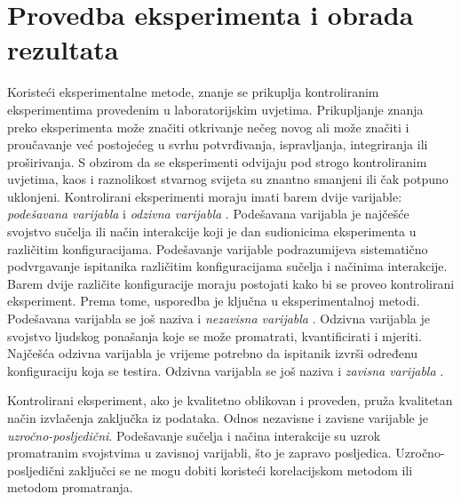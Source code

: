 \documentclass[times, utf8, zavrsni, numeric]{fer}
\begin{document}
\chapter{Provedba eksperimenta i obrada rezultata}
\label{ch:eksperiment}
Koristeći eksperimentalne metode, znanje se prikuplja kontroliranim eksperimentima provedenim u laboratorijskim uvjetima. Prikupljanje znanja preko eksperimenta može značiti otkrivanje nečeg novog ali može značiti i proučavanje već postojećeg u svrhu potvrđivanja, ispravljanja, integriranja ili proširivanja. S obzirom da se eksperimenti odvijaju pod strogo kontroliranim uvjetima, kaos i raznolikost stvarnog svijeta su znantno smanjeni ili čak potpuno uklonjeni. Kontrolirani eksperimenti moraju imati barem dvije varijable: \emph{podešavana varijabla}  i \emph{odzivna varijabla} . Podešavana varijabla je najčešće svojstvo sučelja ili način interakcije koji je dan sudionicima eksperimenta u različitim konfiguracijama. Podešavanje varijable podrazumijeva sistematično podvrgavanje ispitanika različitim konfiguracijama sučelja i načinima interakcije. Barem dvije različite konfiguracije moraju postojati kako bi se proveo kontrolirani eksperiment. Prema tome, usporedba je ključna u eksperimentalnoj metodi. Podešavana varijabla se još naziva i \emph{nezavisna varijabla} . Odzivna varijabla je svojstvo ljudskog ponašanja koje se može promatrati, kvantificirati i mjeriti. Najčešća odzivna varijabla je vrijeme potrebno da ispitanik izvrši određenu konfiguraciju koja se testira. Odzivna varijabla se još naziva i \emph{zavisna varijabla} .

Kontrolirani eksperiment, ako je kvalitetno oblikovan i proveden, pruža kvalitetan način izvlačenja zaključka iz podataka. Odnos nezavisne i zavisne varijable je \emph{uzročno-posljedični}. Podešavanje sučelja i načina interakcije su uzrok promatranim svojstvima u zavisnoj varijabli, što je zapravo posljedica. Uzročno-posljedični zaključci se ne mogu dobiti koristeći korelacijskom metodom ili metodom promatranja.
\end{document}

